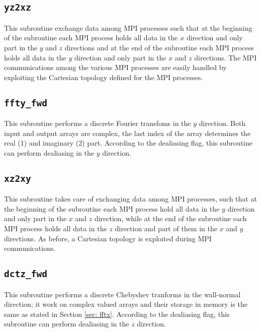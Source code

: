 \subsection{\texttt{yz2xz}}
This subroutine exchange data among MPI processes such that at the beginning of the subroutine each MPI process holds all data in the $x$ direction and only part in the $y$ and $z$ directions and at the end of the subroutine each MPI process holds all data in the $y$ direction and only part in the $x$ and $z$ directions. The MPI communications among the various MPI processes are easily handled by exploiting the Cartesian topology defined for the MPI processes.

\subsection{\texttt{ffty\_fwd}}
This subroutine performs a discrete Fourier transfoms in the $y$ direction. Both input and output arrays are complex, the last index of the array determines the real (1) and imaginary (2) part. According to the dealiasing flag, this subroutine can perform dealiasing in the $y$ direction.

\subsection{\texttt{xz2xy}}
This subroutine takes care of exchanging data among MPI processes, such that at the beginning of the subroutine each MPI process hold all data in the $y$ direction and only part in the $x$ and $z$ direction, while at the end of the subroutine each MPI process holds all data in the $z$ direction and part of them in the $x$ and $y$ directions. As before, a Cartesian topology is exploited during MPI communications.

\subsection{\texttt{dctz\_fwd}}
This subroutine performs a discrete Chebyshev tranforms in the wall-normal direction; it work on complex valued arrays and their storage in memory is the same as stated in Section \ref{sec: fftx}. According to the dealiasing flag, this subroutine can perform dealiasing in the $z$ direction.

